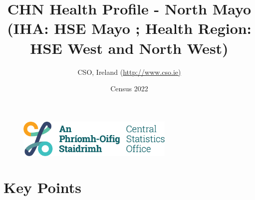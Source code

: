 \documentclass{article}
\title{CHN Health Profile - North Mayo (IHA: HSE Mayo ;  Health Region: HSE West and North West) }
\date{Census 2022}
\author{CSO, Ireland  (\url{http://www.cso.ie)}}
\begin{document}


\begin{figure}
	\centering
\includegraphics[width =75mm]{../figures/CSO_Logo.png}
\end{figure}

				 
		   
						  
														  
																																													
												 
			 
\maketitle
					
													   
				 
						 
																																																																											   
				 
				  
  \pagebreak
    	    \tableofcontents

\pagebreak


\section{Key Points}
\end{document}
